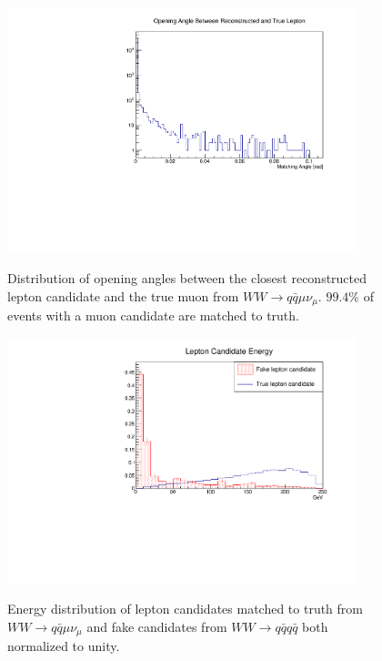 \begin{figure}
\centering
    \begin{minipage}{0.48\textwidth}
        \centering
\label{fig:taupsi}
\includegraphics[width=0.9\textwidth]{matchingangle.pdf}
\caption{Distribution of opening angles between the closest reconstructed lepton candidate and the true muon from $WW \rightarrow q \bar{q} \mu \nu_\mu$. $99.4\%$ of events with a muon candidate are matched to truth.} 
\end{minipage}\hfill
    \begin{minipage}{0.48\textwidth}
        \centering
\label{fig:candE}
\includegraphics[width=0.9\textwidth]{candEnergy.pdf}
\caption{Energy distribution of lepton candidates matched to truth from $WW \rightarrow q \bar{q} \mu \nu_\mu $ and fake candidates from $ WW \rightarrow q\bar{q} q \bar{q}$ both normalized to unity.}
\end{minipage}
\end{figure}



